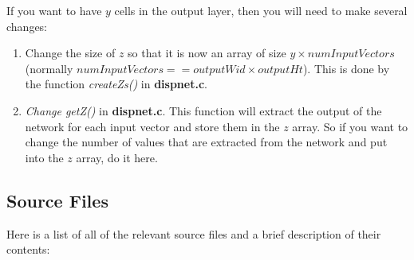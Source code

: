\documentclass[a4paper]{article}
\begin{document}
If you want to have $y$ cells in the output layer, then you will need
to make several changes:
\begin{enumerate}

\item Change the size of $z$ so that it is now an array of size $y
  \times numInputVectors$ (normally $numInputVectors == outputWid
  \times outputHt$).  This is done by the function {\em createZs()} in
  {\bf dispnet.c}.

\item {\em Change getZ()} in {\bf dispnet.c}.  This function will extract the
  output of the network for each input vector and store them in the $z$
  array.  So if you want to change the number of values that are
  extracted from the network and put into the $z$ array, do it here.

\end{enumerate}


\subsection{Source Files}

Here is a list of all of the relevant source files and a brief
description of their contents:
\end{document}
